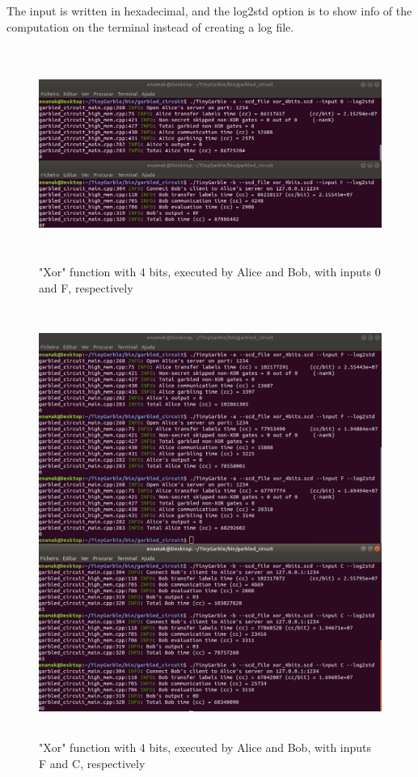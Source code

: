 \begin{refsection}
The input is written in hexadecimal, and the log2std option is to show info of the computation on the terminal instead of creating a log file.

\begin{figure}[H]
	\centering
	\includegraphics[width=1\textwidth, height=7cm]{./sdf/secure_multiparty_computation/figures/tinygarble_xor_4bits_b.png}
    \caption{"Xor" function with 4 bits, executed by Alice and Bob, with inputs 0 and F, respectively}\label{fig:tinygarble_xor_b}
\end{figure}

\begin{figure}[H]
	\centering
	\includegraphics[width=1\textwidth, height=14cm]{./sdf/secure_multiparty_computation/figures/tinygarble_xor_4bits_a.png}
    \caption{"Xor" function with 4 bits, executed by Alice and Bob, with inputs F and C, respectively}\label{fig:tinygarble_xor_a}
\end{figure}


\clearpage
\printbibliography[heading=subbibliography]
\end{refsection}
\cleardoublepage
